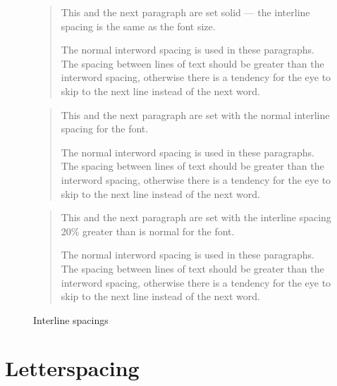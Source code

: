 \documentclass[10pt,a4paper,extrafontsizes]{memoir}
\newcommand{\PWnote}[2]{}
\begin{document}
\begin{figure}
\centering
\begin{minipage}{\textwidth}
\mbox{}\hrulefill\mbox{}
\normalfont\setlength{\unitlength}{\baselineskip}
\begin{quotation}
\normalfont\setlength{\baselineskip}{1em}
    This and the next paragraph are set solid --- the interline spacing 
is the same as the font size. \par
The normal interword spacing is used in these paragraphs.
    The spacing between lines of text should be greater than the interword
spacing, otherwise there is a tendency for the eye to skip to the
next line instead of the next word. \par
\end{quotation}
\begin{quotation}
\normalfont\setlength{\baselineskip}{\unitlength}
    This and the next paragraph are set with the normal interline spacing 
for the font. \par
The normal interword spacing is used in these paragraphs.
    The spacing between lines of text should be greater than the interword
spacing, otherwise there is a tendency for the eye to skip to the
next line instead of the next word. \par
\end{quotation}
\begin{quotation}
\normalfont\setlength{\parskip}{0.2\baselineskip}\setlength{\baselineskip}{1.2\unitlength}
    This and the next paragraph are set with the interline spacing 20\% 
greater than is normal for the font. \par
The normal interword spacing is used in these paragraphs.
    The spacing between lines of text should be greater than the interword
spacing, otherwise there is a tendency for the eye to skip to the
next line instead of the next word. \par
\end{quotation}
\mbox{}\hrulefill\mbox{}
\end{minipage}
\normalfont\setlength{\baselineskip}{\unitlength}
\setlength{\unitlength}{1pt}
\caption{Interline spacings}\label{fig:interline}
\end{figure}
\setlength{\unitlength}{1pt}

\PWnote{2009/03/31}{Added section on letterspacing}
\section{Letterspacing}
\end{document}
